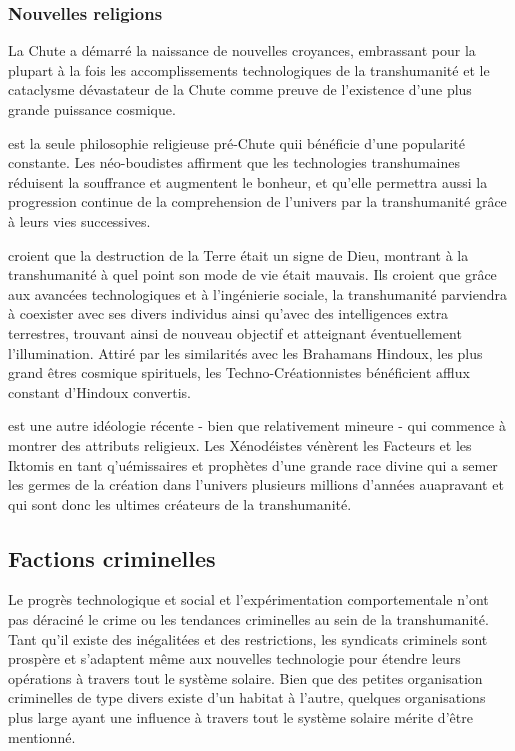 \subsubsection{Nouvelles religions} \label{sec:new-religions} 

La Chute a démarré la naissance de nouvelles croyances, embrassant pour la plupart à la fois les accomplissements technologiques de la transhumanité et le cataclysme dévastateur de la Chute comme preuve de l'existence d'une plus grande puissance cosmique. 

 \label{sec:neo-buddhism} est la seule philosophie religieuse pré-Chute quii bénéficie d'une popularité constante. Les néo-boudistes affirment que les technologies transhumaines réduisent la souffrance et augmentent le bonheur, et qu'elle permettra aussi la progression continue de la comprehension de l'univers par la transhumanité grâce à leurs vies successives. 

 \label{sec:techno-creationists} croient que la destruction de la Terre était un signe de Dieu, montrant à la transhumanité à quel point son mode de vie était mauvais. Ils croient que grâce aux avancées technologiques et à l'ingénierie sociale, la transhumanité parviendra à coexister avec ses divers individus ainsi qu'avec des intelligences extra terrestres, trouvant ainsi de nouveau objectif et atteignant éventuellement l'illumination. Attiré par les similarités avec les Brahamans Hindoux, les plus grand êtres cosmique spirituels, les Techno-Créationnistes bénéficient afflux constant d'Hindoux convertis. 

 \label{sec:xenodeism} est une autre idéologie récente - bien que relativement mineure - qui commence à montrer des attributs religieux. Les Xénodéistes vénèrent les Facteurs et les Iktomis en tant q'uémissaires et prophètes d'une grande race divine qui a semer les germes de la création dans l'univers plusieurs millions d'années auapravant et qui sont donc les ultimes créateurs de la transhumanité. 

\subsection{Factions criminelles} \label{sec:criminal-factions} 

Le progrès technologique et social et l'expérimentation comportementale n'ont pas déraciné le crime ou les tendances criminelles au sein de la transhumanité. Tant qu'il existe des inégalitées et des restrictions, les syndicats criminels sont prospère et s'adaptent même aux nouvelles technologie pour étendre leurs opérations à travers tout le système solaire. Bien que des petites organisation criminelles de type divers existe d'un habitat à l'autre, quelques organisations plus large ayant une influence à travers tout le système solaire mérite d'être mentionné. 

